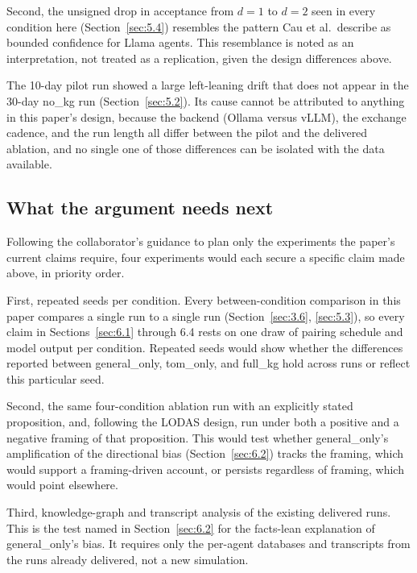 \documentclass[11pt,a4paper]{article}
\newcommand{\cond}[1]{\textsf{#1}}
\begin{document}
Second, the unsigned drop in acceptance from $d = 1$ to $d = 2$ seen in every condition here (Section~\ref{sec:5.4}) resembles the pattern Cau et al.\ describe as bounded confidence for Llama agents. This resemblance is noted as an interpretation, not treated as a replication, given the design differences above.

The 10-day pilot run showed a large left-leaning drift that does not appear in the 30-day \cond{no\_kg} run (Section~\ref{sec:5.2}). Its cause cannot be attributed to anything in this paper's design, because the backend (Ollama versus vLLM), the exchange cadence, and the run length all differ between the pilot and the delivered ablation, and no single one of those differences can be isolated with the data available.

\subsection{What the argument needs next}\label{sec:6.6}

Following the collaborator's guidance to plan only the experiments the paper's current claims require, four experiments would each secure a specific claim made above, in priority order.

First, repeated seeds per condition. Every between-condition comparison in this paper compares a single run to a single run (Section~\ref{sec:3.6}, \ref{sec:5.3}), so every claim in Sections~\ref{sec:6.1} through 6.4 rests on one draw of pairing schedule and model output per condition. Repeated seeds would show whether the differences reported between \cond{general\_only}, \cond{tom\_only}, and \cond{full\_kg} hold across runs or reflect this particular seed.

Second, the same four-condition ablation run with an explicitly stated proposition, and, following the LODAS design, run under both a positive and a negative framing of that proposition. This would test whether \cond{general\_only}'s amplification of the directional bias (Section~\ref{sec:6.2}) tracks the framing, which would support a framing-driven account, or persists regardless of framing, which would point elsewhere.

Third, knowledge-graph and transcript analysis of the existing delivered runs. This is the test named in Section~\ref{sec:6.2} for the facts-lean explanation of \cond{general\_only}'s bias. It requires only the per-agent databases and transcripts from the runs already delivered, not a new simulation.
\end{document}
